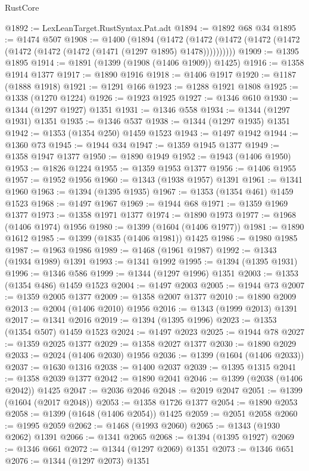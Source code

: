 \begin{lexlean}{RustCore}
\begin{coremodule}
@1892 := LexLeanTarget.RustSyntax.Pat.adt
@1894 := @1892 @68 @34
@1895 := @1474 @507
@1908 := @1400
    (@1894
      (@1472 (@1472 (@1472 (@1472 (@1472 (@1472 (@1472 (@1472 (@1471 (@1297 @1895) @1478))))))))))
@1909 := @1395 @1895
@1914 := @1891 (@1399 (@1908 (@1406 @1909)) @1425)
@1916 := @1358 @1914 @1377
@1917 := @1890 @1916
@1918 := @1406 @1917
@1920 := @1187 (@1888 @1918)
@1921 := @1291 @166
@1923 := @1288 @1921 @1808
@1925 := @1338 (@1270 @1224)
@1926 := @1923 @1925
@1927 := @1346 @610
@1930 := @1344 (@1297 @1927) @1351
@1931 := @1346 @558
@1934 := @1344 (@1297 @1931) @1351
@1935 := @1346 @537
@1938 := @1344 (@1297 @1935) @1351
@1942 := @1353 (@1354 @250) @1459 @1523
@1943 := @1497 @1942
@1944 := @1360 @73
@1945 := @1944 @34
@1947 := @1359 @1945 @1377
@1949 := @1358 @1947 @1377
@1950 := @1890 @1949
@1952 := @1943 (@1406 @1950)
@1953 := @1826 @1224
@1955 := @1359 @1953 @1377
@1956 := @1406 @1955
@1957 := @1952 @1956
@1960 := @1343 (@1938 @1957) @1391
@1961 := @1341 @1960
@1963 := @1394 (@1395 @1935)
@1967 := @1353 (@1354 @461) @1459 @1523
@1968 := @1497 @1967
@1969 := @1944 @68
@1971 := @1359 @1969 @1377
@1973 := @1358 @1971 @1377
@1974 := @1890 @1973
@1977 := @1968 (@1406 @1974) @1956
@1980 := @1399 (@1604 (@1406 @1977))
@1981 := @1890 @1612
@1985 := @1399 (@1835 (@1406 @1981)) @1425
@1986 := @1980 @1985
@1987 := @1963 @1986
@1989 := @1468 (@1961 @1987)
@1992 := @1343 (@1934 @1989) @1391
@1993 := @1341 @1992
@1995 := @1394 (@1395 @1931)
@1996 := @1346 @586
@1999 := @1344 (@1297 @1996) @1351
@2003 := @1353 (@1354 @486) @1459 @1523
@2004 := @1497 @2003
@2005 := @1944 @73
@2007 := @1359 @2005 @1377
@2009 := @1358 @2007 @1377
@2010 := @1890 @2009
@2013 := @2004 (@1406 @2010) @1956
@2016 := @1343 (@1999 @2013) @1391
@2017 := @1341 @2016
@2019 := @1394 (@1395 @1996)
@2023 := @1353 (@1354 @507) @1459 @1523
@2024 := @1497 @2023
@2025 := @1944 @78
@2027 := @1359 @2025 @1377
@2029 := @1358 @2027 @1377
@2030 := @1890 @2029
@2033 := @2024 (@1406 @2030) @1956
@2036 := @1399 (@1604 (@1406 @2033))
@2037 := @1630 @1316
@2038 := @1400 @2037
@2039 := @1395 @1315
@2041 := @1358 @2039 @1377
@2042 := @1890 @2041
@2046 := @1399 (@2038 (@1406 @2042)) @1425
@2047 := @2036 @2046
@2048 := @2019 @2047
@2051 := @1399 (@1604 (@2017 @2048))
@2053 := @1358 @1726 @1377
@2054 := @1890 @2053
@2058 := @1399 (@1648 (@1406 @2054)) @1425
@2059 := @2051 @2058
@2060 := @1995 @2059
@2062 := @1468 (@1993 @2060)
@2065 := @1343 (@1930 @2062) @1391
@2066 := @1341 @2065
@2068 := @1394 (@1395 @1927)
@2069 := @1346 @661
@2072 := @1344 (@1297 @2069) @1351
@2073 := @1346 @651
@2076 := @1344 (@1297 @2073) @1351

\end{coremodule}
\end{lexlean}
